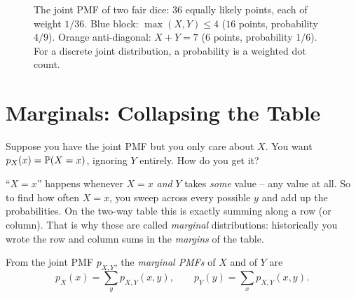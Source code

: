 \begin{figure}[H]
\centering
{}
\caption{The joint PMF of two fair dice: $36$ equally likely points, each of
weight $1/36$. Blue block: $\max(X,Y)\le 4$ ($16$ points, probability $4/9$).
Orange anti-diagonal: $X+Y=7$ ($6$ points, probability $1/6$). For a discrete
joint distribution, a probability is a weighted dot count.}
\label{ch13:fig-dicegrid}
\end{figure}

\section{Marginals: Collapsing the Table}
\label{ch13:marginals}

Suppose you have the joint PMF but you only care about $X$. You want
$p_X(x) = \P(X=x)$, ignoring $Y$ entirely. How do you get it?

\begin{intuitionbox}
``$X=x$'' happens whenever $X=x$ \emph{and} $Y$ takes \emph{some} value -- any
value at all. So to find how often $X=x$, you sweep across every possible $y$ and
add up the probabilities. On the two-way table this is exactly summing along a
row (or column). That is why these are called \emph{marginal} distributions:
historically you wrote the row and column sums in the \emph{margins} of the
table.
\end{intuitionbox}

\begin{definition}
\label{ch13:def-marginal-pmf}
From the joint PMF $p_{X,Y}$, the \emph{marginal PMFs} of $X$ and of $Y$ are
\[
  p_X(x) = \sum_{y} p_{X,Y}(x,y), \qquad
  p_Y(y) = \sum_{x} p_{X,Y}(x,y).
\]
\end{definition}

